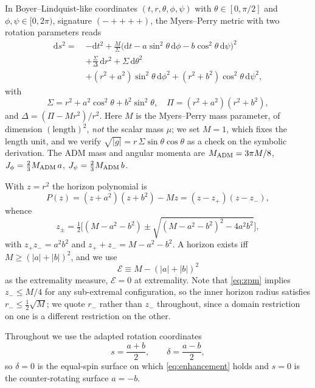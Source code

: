\documentclass[aps,prd,reprint,superscriptaddress,nofootinbib,longbibliography]{revtex4-2}
\theoremstyle{plain}
\theoremstyle{definition}
\theoremstyle{remark}
\newcommand{\dd}{\mathrm{d}}
\begin{document}
In Boyer--Lindquist-like coordinates $(t,r,\theta,\phi,\psi)$ with
$\theta\in[0,\pi/2]$ and $\phi,\psi\in[0,2\pi)$, signature $(-++++)$, the
Myers--Perry metric with two rotation parameters reads
\begin{align}\label{eq:metric}
  \dd s^2 =\ & -\dd t^2
    + \frac{M}{\Sigma}\Big(\dd t - a\sin^2\!\theta\,\dd\phi
      - b\cos^2\!\theta\,\dd\psi\Big)^{\!2} \nonumber\\
    &+ \frac{\Sigma}{\Delta}\,\dd r^2 + \Sigma\,\dd\theta^2 \nonumber\\
    &+ (r^2+a^2)\sin^2\!\theta\,\dd\phi^2
     + (r^2+b^2)\cos^2\!\theta\,\dd\psi^2 ,
\end{align}
with
\begin{equation}\label{eq:sigmapi}
  \Sigma = r^2 + a^2\cos^2\!\theta + b^2\sin^2\!\theta,\quad
  \Pi = (r^2+a^2)(r^2+b^2),
\end{equation}
and $\Delta=(\Pi-Mr^2)/r^2$. Here $M$ is the Myers--Perry mass parameter, of
dimension $(\text{length})^2$, \emph{not} the scalar mass $\mu$; we set $M=1$,
which fixes the length unit, and we verify
$\sqrt{|g|}=r\,\Sigma\sin\theta\cos\theta$ as a check on the symbolic
derivation. The ADM mass and angular momenta are
$M_{\rm ADM}=3\pi M/8$, $J_\phi = \tfrac{2}{3}M_{\rm ADM}\,a$,
$J_\psi = \tfrac{2}{3}M_{\rm ADM}\,b$.

With $z=r^2$ the horizon polynomial is
\begin{equation}\label{eq:horizonpoly}
  P(z) = (z+a^2)(z+b^2) - Mz = (z-z_+)(z-z_-),
\end{equation}
whence
\begin{equation}\label{eq:zpm}
  z_\pm = \tfrac12\Big[(M-a^2-b^2)\pm\sqrt{(M-a^2-b^2)^2-4a^2b^2}\Big],
\end{equation}
with $z_+z_-=a^2b^2$ and $z_++z_-=M-a^2-b^2$. A horizon exists iff
$M\ge(|a|+|b|)^2$, and we use
\begin{equation}\label{eq:extremality}
  \mathcal{E}\equiv M-(|a|+|b|)^2
\end{equation}
as the extremality measure, $\mathcal{E}=0$ at extremality. Note that
\eqref{eq:zpm} implies $z_-\le M/4$ for any sub-extremal configuration, so the
inner horizon radius satisfies $r_-\le\tfrac12\sqrt M$; we quote $r_-$ rather
than $z_-$ throughout, since a domain restriction on one is a different
restriction on the other.

Throughout we use the adapted rotation coordinates
\begin{equation}\label{eq:sdelta}
  s=\frac{a+b}{2},\qquad \delta=\frac{a-b}{2},
\end{equation}
so $\delta=0$ is the equal-spin surface on which \eqref{eq:enhancement} holds
and $s=0$ is the counter-rotating surface $a=-b$.
\end{document}
